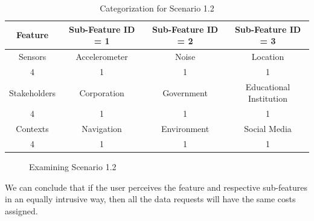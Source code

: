 \begin{table}[h!]
  \centering
  \caption{Categorization for Scenario 1.2}
  \label{tab:scenario12}
  \begin{tabular}{cccc}
    \toprule
    Feature & Sub-Feature ID = 1 & Sub-Feature ID = 2 & Sub-Feature ID = 3\\
    \midrule
    Sensors & Accelerometer & Noise & Location\\
     4 & 1 & 1 & 1\\ \hhline{====}
     Stakeholders & Corporation & Government & Educational Institution\\
     4 & 1 & 1 & 1\\ \hhline{====}
     Contexts & Navigation & Environment & Social Media\\
     4 & 1 & 1 & 1\\ 
    \bottomrule
  \end{tabular}
\end{table}

\begin{figure}[htp]
  \caption{Examining Scenario 1.2}
  \label{fig:scenatio12}
\end{figure}

We can conclude that if the user perceives the feature and respective sub-features in an equally intrusive way, then all the
data requests will have the same costs assigned.

